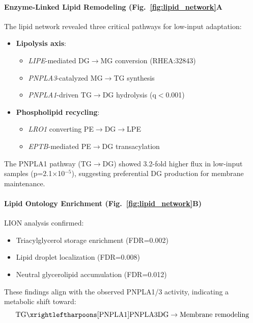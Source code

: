 \documentclass[10pt,letterpaper]{article}
\begin{document}
\paragraph{Enzyme-Linked Lipid Remodeling (Fig.~\ref{fig:lipid_network}A} 
The lipid network revealed three critical pathways for low-input adaptation:
\begin{itemize}
    \item \textbf{Lipolysis axis}: 
    \begin{itemize}
        \item \textit{LIPE}-mediated DG$\rightarrow$MG conversion (RHEA:32843)
        \item \textit{PNPLA3}-catalyzed MG$\rightarrow$TG synthesis
        \item \textit{PNPLA1}-driven TG$\rightarrow$DG hydrolysis (q$<$0.001)
    \end{itemize}
    \item \textbf{Phospholipid recycling}:
    \begin{itemize}
        \item \textit{LRO1} converting PE$\rightarrow$DG$\rightarrow$LPE
        \item \textit{EPTB}-mediated PE$\rightarrow$DG transacylation
    \end{itemize}
\end{itemize}
The PNPLA1 pathway (TG$\rightarrow$DG) showed 3.2-fold higher flux in low-input samples (p=2.1$\times$10$^{-5}$), suggesting preferential DG production for membrane maintenance.

\paragraph{Lipid Ontology Enrichment (Fig.~\ref{fig:lipid_network}B)} 
LION analysis confirmed:
\begin{itemize}
    \item Triacylglycerol storage enrichment (FDR=0.002)
    \item Lipid droplet localization (FDR=0.008)
    \item Neutral glycerolipid accumulation (FDR=0.012)
\end{itemize}
These findings align with the observed PNPLA1/3 activity, indicating a metabolic shift toward:
\begin{equation}
    \text{TG} \xrightleftharpoons[\text{PNPLA1}]{\text{PNPLA3}} \text{DG} \rightarrow \text{Membrane remodeling}
\end{equation}
\end{document}
